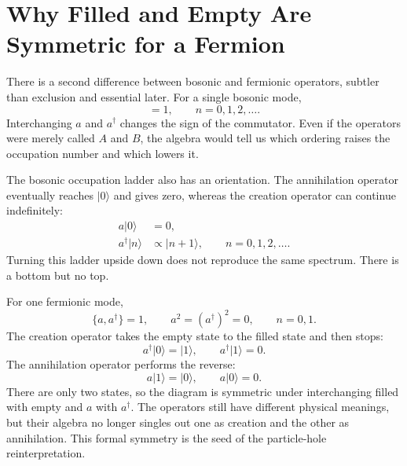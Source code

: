 \section{Why Filled and Empty Are Symmetric for a Fermion}

There is a second difference between bosonic and fermionic operators, subtler than exclusion and essential later. For a single bosonic mode,
\begin{equation}
[a,a^\dagger]=1,
\qquad
n=0,1,2,\ldots.
\end{equation}
Interchanging \(a\) and \(a^\dagger\) changes the sign of the commutator. Even if the operators were merely called \(A\) and \(B\), the algebra would tell us which ordering raises the occupation number and which lowers it.

The bosonic occupation ladder also has an orientation. The annihilation operator eventually reaches \(\lvert0\rangle\) and gives zero, whereas the creation operator can continue indefinitely:
\begin{align}
a\lvert0\rangle&=0,\\
a^\dagger\lvert n\rangle&\propto\lvert n+1\rangle,
\qquad n=0,1,2,\ldots.
\end{align}
Turning this ladder upside down does not reproduce the same spectrum. There is a bottom but no top.

For one fermionic mode,
\begin{equation}
\{a,a^\dagger\}=1,
\qquad
a^2=(a^\dagger)^2=0,
\qquad
n=0,1.
\label{eq:l10-fermion-mode}
\end{equation}
The creation operator takes the empty state to the filled state and then stops:
\begin{equation}
a^\dagger\lvert0\rangle=\lvert1\rangle,
\qquad
a^\dagger\lvert1\rangle=0.
\end{equation}
The annihilation operator performs the reverse:
\begin{equation}
a\lvert1\rangle=\lvert0\rangle,
\qquad
a\lvert0\rangle=0.
\end{equation}
There are only two states, so the diagram is symmetric under interchanging filled with empty and \(a\) with \(a^\dagger\). The operators still have different physical meanings, but their algebra no longer singles out one as creation and the other as annihilation. This formal symmetry is the seed of the particle-hole reinterpretation.

\begin{classroomqa}
\end{classroomqa}

